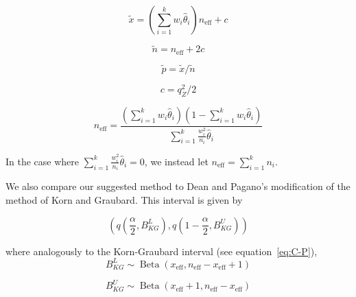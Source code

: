 \documentclass[AMA,STIX1COL]{WileyNJD-v2}
\begin{document}
\begin{equation*}
   \tilde{x} = \left( \sum_{i=1}^k w_i \hat{\theta}_i \right) n_{\text{eff}} + c 
\end{equation*}

\begin{equation*}
   \tilde{n} = n_{\text{eff}} + 2c 
\end{equation*}

\begin{equation*}
    \tilde{p} = \tilde{x} / \tilde{n}
\end{equation*}

\begin{equation*}
   c = q_Z^2/2
\end{equation*}

\begin{equation}
   n_{\text{eff}} = \frac{\left( \sum_{i=1}^k w_i \hat{\theta}_i \right) \left(1 - \sum_{i=1}^k w_i \hat{\theta}_i \right)}{\sum_{i=1}^k \frac{w_i^2}{n_i}\hat{\theta}_i} 
   \label{eq:neff}
\end{equation}
 
In the case where \( \sum_{i=1}^k \frac{w_i^2}{n_i}\hat{\theta}_i = 0 \), we instead let \( n_{\text{eff}} = \sum_{i=1}^k n_i \).

We also compare our suggested method to Dean and Pagano's modification of the method of Korn and Graubard\cite{Korn:1998,Dean:2015}.
This interval is given by 

\begin{equation}
    \left( q \left( \frac{\alpha}{2}, B^L_{KG} \right), q \left( 1 - \frac{\alpha}{2}, B^U_{KG} \right)  \right)
\end{equation}

where analogously to the Korn-Graubard interval (see equation~\ref{eq:C-P}),
\begin{equation*}
    B^L_{KG} \sim \operatorname{Beta}\left(x_{\text{eff}},  n_{\text{eff}} -  x_{\text{eff}} + 1 \right)
\end{equation*}

\begin{equation*}
    B^U_{KG} \sim \operatorname{Beta}\left(x_{\text{eff}} + 1, n_{\text{eff}} - x_{\text{eff}} \right)
\end{equation*}
\end{document}
